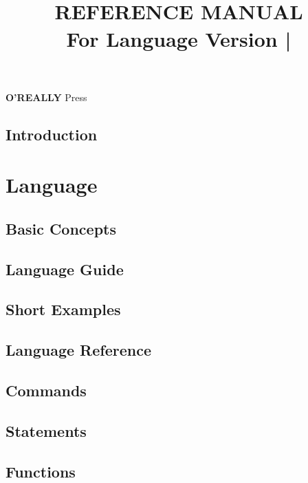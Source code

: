 \documentclass[10pt, stock, openany, chapter]{memoir}
\title{\HUGE\textbf{\MakeUppercase{\tbas} \\ REFERENCE MANUAL} \\ \Large \vspace{1em} For Language Version \tbasver\hspace{0.75em}|\hspace{0.75em}\theedition}
\date{}
\author{}
\newcommand{\oreallypress}{\begingroup\hspace{0.083em}\large\textbf{O'REALLY\raisebox{1ex}{\scriptsize ?}} \large Press\endgroup}
\begin{document}
\maketitle{}
\thispagestyle{empty}
\vfill
\oreallypress

\newpage


\thispagestyle{empty}

\newpage

\setcounter{page}{3}
\tableofcontents*



\openright
\chapter{Introduction}

\openany



\part{Language}

\chapter{Basic Concepts}


\chapter{Language Guide}


\chapter{Short Examples}


\chapter{Language Reference}


\chapter{Commands}


\chapter{Statements}


\chapter{Functions}

\end{document}
